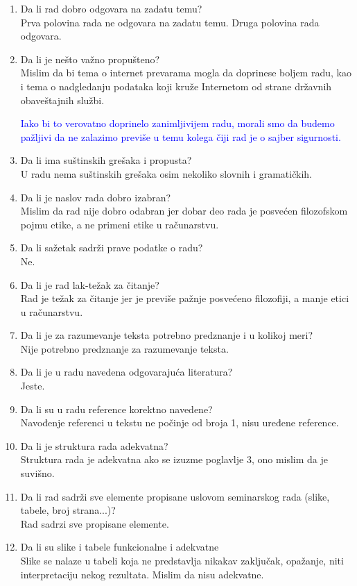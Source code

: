 \documentclass[a4paper]{report}
\newcommand{\odgovor}[1]{\textcolor{blue}{#1}}
\begin{document}
\begin{enumerate}
\item Da li rad dobro odgovara na zadatu temu?\\
Prva polovina rada ne odgovara na zadatu temu. Druga polovina rada odgovara.
\item Da li je nešto važno propušteno?\\
Mislim da bi tema o internet prevarama mogla da doprinese boljem radu, kao i tema o nadgledanju podataka koji kruže Internetom od strane državnih obaveštajnih službi.

\odgovor{Iako bi to verovatno doprinelo zanimljivijem radu, morali smo da budemo pažljivi da ne zalazimo previše u temu kolega čiji rad je o sajber sigurnosti.}

\item Da li ima suštinskih grešaka i propusta?\\
U radu nema suštinskih grešaka osim nekoliko slovnih i gramatičkih.
\item Da li je naslov rada dobro izabran?\\
Mislim da rad nije dobro odabran jer dobar deo rada je posvećen filozofskom pojmu etike, a ne primeni etike u računarstvu.
\item Da li sažetak sadrži prave podatke o radu?\\
Ne.
\item Da li je rad lak-težak za čitanje?\\
Rad je težak za čitanje jer je previše pažnje posvećeno filozofiji, a manje etici u računarstvu.
\item Da li je za razumevanje teksta potrebno predznanje i u kolikoj meri?\\
Nije potrebno predznanje za razumevanje teksta.
\item Da li je u radu navedena odgovarajuća literatura?\\
Jeste.
\item Da li su u radu reference korektno navedene?\\
Navođenje referenci u tekstu ne počinje od broja 1, nisu uređene reference.
\item Da li je struktura rada adekvatna?\\
Struktura rada je adekvatna ako se izuzme poglavlje 3, ono mislim da je suvišno.
\item Da li rad sadrži sve elemente propisane uslovom seminarskog rada (slike, tabele, broj strana...)?\\
Rad sadrzi sve propisane elemente.

\item Da li su slike i tabele funkcionalne i adekvatne\\
Slike se nalaze u tabeli koja ne predstavlja nikakav zaključak, opažanje, niti interpretaciju nekog rezultata. Mislim da nisu adekvatne.
\end{enumerate}
\end{document}
